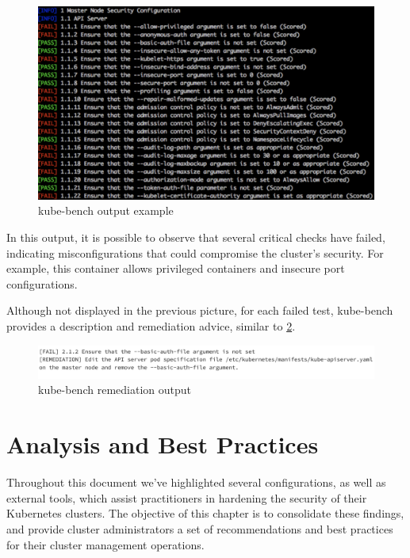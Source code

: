 \documentclass[a4paper,11pt,openright,BCOR=15mm]{scrbook}
\begin{document}
\begin{figure}[h!]
	\centering
	\label{fig:kubeBenchOutput}
	\includegraphics[scale=0.5]{figs/kube-bench-output.png}
	\caption{kube-bench output example \cite{noauthor_kube_bench_nodate}}
\end{figure}

In this output, it is possible to observe that several critical checks have failed, indicating misconfigurations that could compromise the cluster's security. For example, this container allows privileged containers and insecure port configurations.

Although not displayed in the previous picture, for each failed test, kube-bench provides a description and remediation advice, similar to \ref{fig:kubeBenchRemediation}.

\begin{figure}[h!]
	\centering
	\label{fig:kubeBenchRemediation}
	\includegraphics[scale=0.45]{figs/kube-bench-remediation.png}
	\caption{kube-bench remediation output \cite{benhassan_depth_2024}}
\end{figure}

	\chapter{Analysis and Best Practices}

Throughout this document we've highlighted several configurations, as well as external tools, which assist practitioners in hardening the security of their Kubernetes clusters. The objective of this chapter is to consolidate these findings, and provide cluster administrators a set of recommendations and best practices for their cluster management operations.
\end{document}
